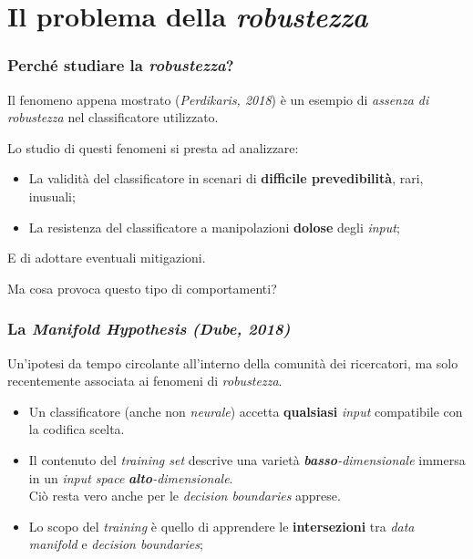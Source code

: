 \documentclass{beamer}
\begin{document}
\section{Il problema della \textit{robustezza}}{

\begin{frame}
	\frametitle{Perché studiare la \textit{robustezza}?}
	Il fenomeno appena mostrato (\textit{Perdikaris, 2018}) è un esempio di \textit{assenza di \alert{robustezza}} nel classificatore utilizzato.
	\hfill\break

	Lo studio di questi fenomeni si presta ad analizzare:
	\hfill\break

	\begin{itemize}
		\item{La validità del classificatore in scenari di \textbf{difficile prevedibilità}, rari, inusuali;}
		\item{La resistenza del classificatore a manipolazioni \textbf{dolose} degli \textit{input}};
	\end{itemize}
	\hfill\break
	E di adottare eventuali mitigazioni.

	\hfill\break

	Ma cosa provoca questo tipo di comportamenti?
\end{frame}


\begin{frame}
	\frametitle{La \textit{Manifold Hypothesis} \textit{(Dube, 2018)}}
	Un'ipotesi da tempo circolante all'interno della comunità dei ricercatori, ma solo recentemente associata ai fenomeni di \textit{robustezza}.
	\hfill\break

	\begin{itemize}
		\item{Un classificatore (anche non \textit{neurale}) accetta \textbf{qualsiasi} \textit{input} compatibile con la codifica scelta.}
		\item{Il contenuto del \textit{training set} descrive una varietà \textit{\textbf{basso}-dimensionale} immersa in un \textit{input space} \textit{\textbf{alto}-dimensionale}.\\Ciò resta vero anche per le \textit{\alert{decision boundaries}} apprese.}
		\item{Lo scopo del \textit{training} è quello di apprendere le \textbf{intersezioni} tra \textit{data manifold} e \textit{decision boundaries};}
	\end{itemize}
\end{frame}

}
\end{document}

